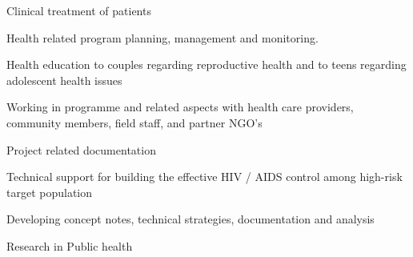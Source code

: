 \documentclass[margin,line]{res}
\newenvironment{list1}{
  \begin{list}{\ding{113}}{%
      \setlength{\itemsep}{0in}
      \setlength{\parsep}{0in} \setlength{\parskip}{0in}
      \setlength{\topsep}{0in} \setlength{\partopsep}{0in} 
      \setlength{\leftmargin}{0.17in}}}{\end{list}}
\begin{document}
\begin{resume}
Clinical treatment of patients

\vspace{-0.8em}

Health related program planning, management and monitoring.

\vspace{-0.8em}

Health education to couples regarding reproductive health
and to teens regarding adolescent health issues

\vspace{-0.8em}

Working in programme and related aspects with health care
providers, community members, field staff, and partner NGO's

\vspace{-0.8em}

Project related documentation

\vspace{-0.8em}

Technical support for building the
effective HIV / AIDS control among high-risk target
population

\vspace{-0.8em}

Developing concept notes, technical strategies, documentation and analysis

\vspace{-0.8em}

Research in Public health








\end{resume}
\end{document}
